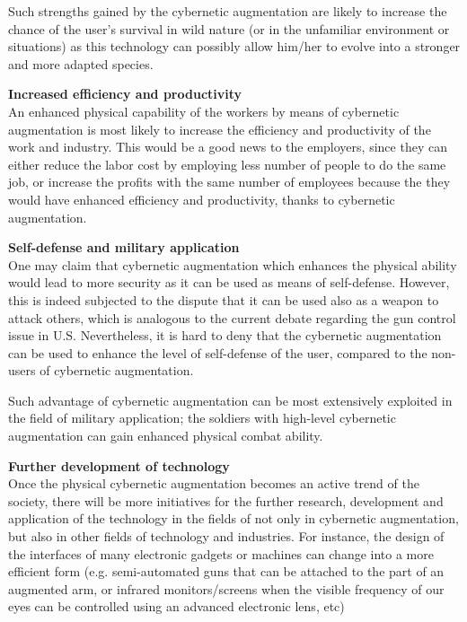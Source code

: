 Such strengths gained by the cybernetic augmentation are likely to increase the chance of the user's survival in wild nature (or in the unfamiliar environment or situations) as this technology can possibly allow him/her to evolve into a stronger and more adapted species. 

{\bf Increased efficiency and productivity}\\
An enhanced physical capability of the workers by means of cybernetic augmentation is most likely to increase the efficiency and productivity of the work and industry. This would be a good news to the employers, since they can either reduce the labor cost by employing less number of people to do the same job, or increase the profits with the same number of employees because the they would have enhanced efficiency and productivity, thanks to cybernetic augmentation.

{\bf Self-defense and military application}\\
One may claim that cybernetic augmentation which enhances the physical ability would lead to more security as it can be used as means of self-defense. However, this is indeed subjected to the dispute that it can be used also as a weapon to attack others, which is analogous to the current debate regarding the gun control issue in U.S. Nevertheless, it is hard to deny that the cybernetic augmentation can be used to enhance the level of self-defense of the user, compared to the non-users of cybernetic augmentation.

Such advantage of cybernetic augmentation can be most extensively exploited in the field of military application; the soldiers with high-level cybernetic augmentation can gain enhanced physical combat ability.

{\bf Further development of technology}\\
Once the physical cybernetic augmentation becomes an active trend of the society, there will be more initiatives for the further research, development and application of the technology in the fields of not only in cybernetic augmentation, but also in other fields of technology and industries. For instance, the design of the interfaces of many electronic gadgets or machines can change into a more efficient form (e.g. semi-automated guns that can be attached to the part of an augmented arm, or infrared monitors/screens when the visible frequency of our eyes can be controlled using an advanced electronic lens, etc)


